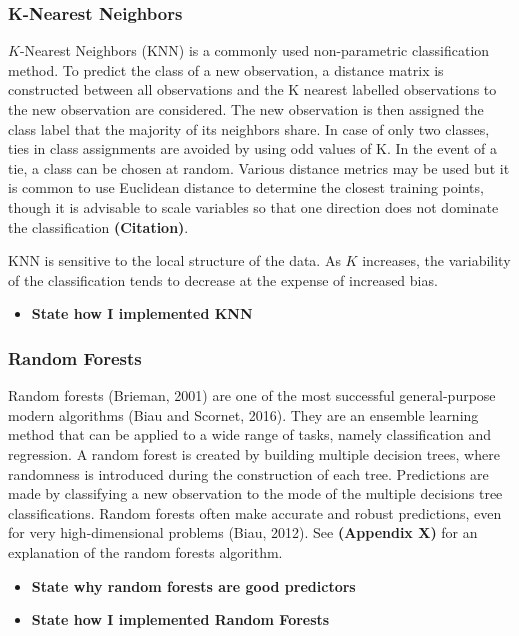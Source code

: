 \documentclass[12pt,]{article}
\providecommand{\tightlist}{%
  \setlength{\itemsep}{0pt}\setlength{\parskip}{0pt}}
\begin{document}
\subsubsection{K-Nearest Neighbors}\label{k-nearest-neighbors}

\(K\)-Nearest Neighbors (KNN) is a commonly used non-parametric
classification method. To predict the class of a new observation, a
distance matrix is constructed between all observations and the K
nearest labelled observations to the new observation are considered. The
new observation is then assigned the class label that the majority of
its neighbors share. In case of only two classes, ties in class
assignments are avoided by using odd values of K. In the event of a tie,
a class can be chosen at random. Various distance metrics may be used
but it is common to use Euclidean distance to determine the closest
training points, though it is advisable to scale variables so that one
direction does not dominate the classification \textbf{(Citation)}.

KNN is sensitive to the local structure of the data. As \(K\) increases,
the variability of the classification tends to decrease at the expense
of increased bias.

\begin{itemize}
\tightlist
\item
  \textbf{State how I implemented KNN}
\end{itemize}

\subsubsection{Random Forests}\label{random-forests}

Random forests (Brieman, 2001) are one of the most successful
general-purpose modern algorithms (Biau and Scornet, 2016). They are an
ensemble learning method that can be applied to a wide range of tasks,
namely classification and regression. A random forest is created by
building multiple decision trees, where randomness is introduced during
the construction of each tree. Predictions are made by classifying a new
observation to the mode of the multiple decisions tree classifications.
Random forests often make accurate and robust predictions, even for very
high-dimensional problems (Biau, 2012). See \textbf{(Appendix X)} for an
explanation of the random forests algorithm.

\begin{itemize}
\tightlist
\item
  \textbf{State why random forests are good predictors}\\
\item
  \textbf{State how I implemented Random Forests}
\end{itemize}
\end{document}
